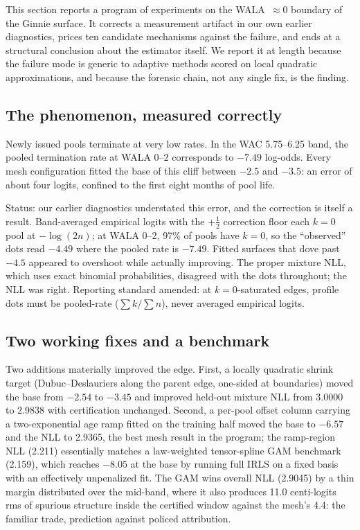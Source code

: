 \documentclass[11pt]{article}
\begin{document}
This section reports a program of experiments on the WALA~$\approx 0$
boundary of the Ginnie surface. It corrects a measurement artifact in
our own earlier diagnostics, prices ten candidate mechanisms against
the failure, and ends at a structural conclusion about the estimator
itself. We report it at length because the failure mode is generic to
adaptive methods scored on local quadratic approximations, and because
the forensic chain, not any single fix, is the finding.

\subsection{The phenomenon, measured correctly}

Newly issued pools terminate at very low rates. In the WAC 5.75--6.25
band, the pooled termination rate at WALA 0--2 corresponds to
$-7.49$ log-odds. Every mesh configuration fitted the base of this
cliff between $-2.5$ and $-3.5$: an error of about four logits,
confined to the first eight months of pool life.

Status: our earlier diagnostics understated this error, and the
correction is itself a result. Band-averaged empirical logits with the
$+\tfrac12$ correction floor each $k=0$ pool at $-\log(2n)$; at WALA
0--2, 97\% of pools have $k=0$, so the ``observed'' dots read $-4.49$
where the pooled rate is $-7.49$. Fitted surfaces that dove past
$-4.5$ appeared to overshoot while actually improving. The proper
mixture NLL, which uses exact binomial probabilities, disagreed with
the dots throughout; the NLL was right. Reporting standard amended:
at $k=0$-saturated edges, profile dots must be pooled-rate
($\sum k/\sum n$), never averaged empirical logits.

\subsection{Two working fixes and a benchmark}

Two additions materially improved the edge. First, a locally quadratic
shrink target (Dubuc--Deslauriers along the parent edge, one-sided at
boundaries) moved the base from $-2.54$ to $-3.45$ and improved
held-out mixture NLL from 3.0000 to 2.9838 with certification
unchanged. Second, a per-pool offset column carrying a two-exponential
age ramp fitted on the training half moved the base to $-6.57$ and the
NLL to 2.9365, the best mesh result in the program; the ramp-region
NLL (2.211) essentially matches a law-weighted tensor-spline GAM
benchmark (2.159), which reaches $-8.05$ at the base by running full
IRLS on a fixed basis with an effectively unpenalized fit. The GAM
wins overall NLL (2.9045) by a thin margin distributed over the
mid-band, where it also produces 11.0 centi-logits rms of spurious
structure inside the certified window against the mesh's 4.4: the
familiar trade, prediction against policed attribution.
\end{document}
